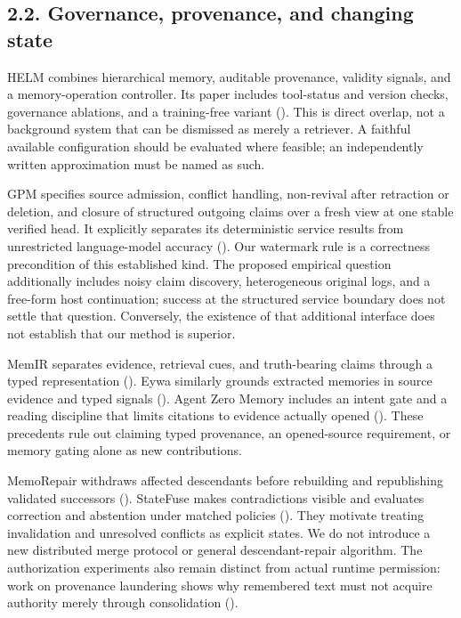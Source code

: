 \documentclass[
  11pt,
  a4paper,
]{article}
\begin{document}
\subsection{2.2. Governance, provenance, and changing
state}\label{governance-provenance-and-changing-state}

HELM combines hierarchical memory, auditable provenance, validity
signals, and a memory-operation controller. Its paper includes
tool-status and version checks, governance ablations, and a
training-free variant ().
This is direct overlap, not a background system that can be dismissed as
merely a retriever. A faithful available configuration should be
evaluated where feasible; an independently written approximation must be
named as such.

GPM specifies source admission, conflict handling, non-revival after
retraction or deletion, and closure of structured outgoing claims over a
fresh view at one stable verified head. It explicitly separates its
deterministic service results from unrestricted language-model accuracy
(). Our watermark rule is a
correctness precondition of this established kind. The proposed
empirical question additionally includes noisy claim discovery,
heterogeneous original logs, and a free-form host continuation; success
at the structured service boundary does not settle that question.
Conversely, the existence of that additional interface does not
establish that our method is superior.

MemIR separates evidence, retrieval cues, and truth-bearing claims
through a typed representation (). Eywa similarly grounds extracted memories in source evidence and
typed signals (). Agent Zero
Memory includes an intent gate and a reading discipline that limits
citations to evidence actually opened (). These precedents rule out claiming typed provenance, an
opened-source requirement, or memory gating alone as new contributions.

MemoRepair withdraws affected descendants before rebuilding and
republishing validated successors
(). StateFuse makes
contradictions visible and evaluates correction and abstention under
matched policies (). They motivate treating invalidation and unresolved conflicts as
explicit states. We do not introduce a new distributed merge protocol or
general descendant-repair algorithm. The authorization experiments also
remain distinct from actual runtime permission: work on provenance
laundering shows why remembered text must not acquire authority merely
through consolidation ().
\end{document}
